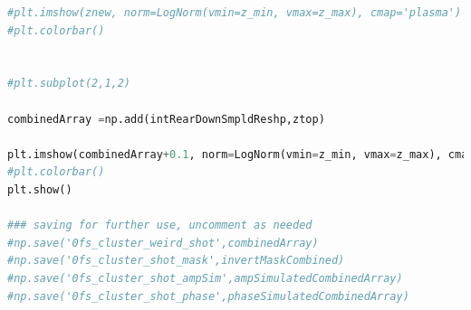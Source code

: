 \begin{lstlisting}[language=Python,frame=single,basicstyle=\footnotesize]
#plt.imshow(znew, norm=LogNorm(vmin=z_min, vmax=z_max), cmap='plasma')
#plt.colorbar()


#plt.subplot(2,1,2)

combinedArray =np.add(intRearDownSmpldReshp,ztop)

plt.imshow(combinedArray+0.1, norm=LogNorm(vmin=z_min, vmax=z_max), cmap='plasma')
#plt.colorbar()
plt.show()

### saving for further use, uncomment as needed
#np.save('0fs_cluster_weird_shot',combinedArray)
#np.save('0fs_cluster_shot_mask',invertMaskCombined)
#np.save('0fs_cluster_shot_ampSim',ampSimulatedCombinedArray)
#np.save('0fs_cluster_shot_phase',phaseSimulatedCombinedArray)

\end{lstlisting}
%
%
%